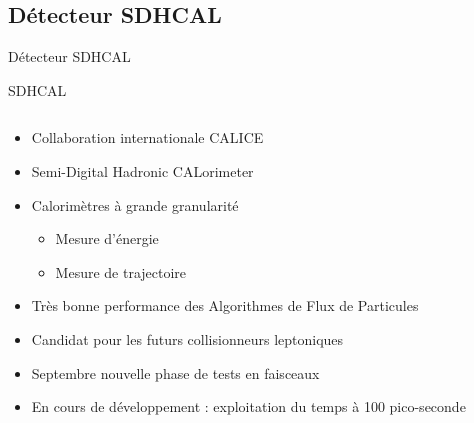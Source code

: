 \documentclass[9pt]{beamer}
\begin{document}

\subsection{Détecteur SDHCAL}

\begin{frame}{Détecteur SDHCAL}
    \begin{block}{SDHCAL}

        \begin{columns}
            \begin{column}{0.5\textwidth}
                \begin{itemize}
                    \item Collaboration internationale CALICE
                    \item Semi-Digital Hadronic CALorimeter
                    \item Calorimètres à grande granularité
                    \begin{itemize}
                        \item Mesure d'énergie
                        \item Mesure de trajectoire
                        
                    \end{itemize}
                    \item Très bonne performance des Algorithmes de Flux de Particules
                    \item Candidat pour les futurs collisionneurs leptoniques
                    \item Septembre nouvelle phase de tests en faisceaux
                    \item En cours de développement : exploitation du temps à 100 pico-seconde
                \end{itemize}
            \end{column}
	

\end{columns}
\end{block}
\end{frame}
\end{document}
